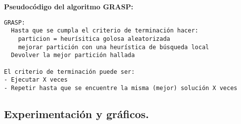 \textbf{Pseudocódigo del algoritmo GRASP:}

\vspace*{0.1cm}

\begin{verbatim}
GRASP:
  Hasta que se cumpla el criterio de terminación hacer:
    particion = heurísitica golosa aleatorizada
    mejorar partición con una heurística de búsqueda local
  Devolver la mejor partición hallada

El criterio de terminación puede ser:
- Ejecutar X veces
- Repetir hasta que se encuentre la misma (mejor) solución X veces
\end{verbatim}

\newpage
\subsection{Experimentación y gráficos.}
\vspace*{0.3cm}

